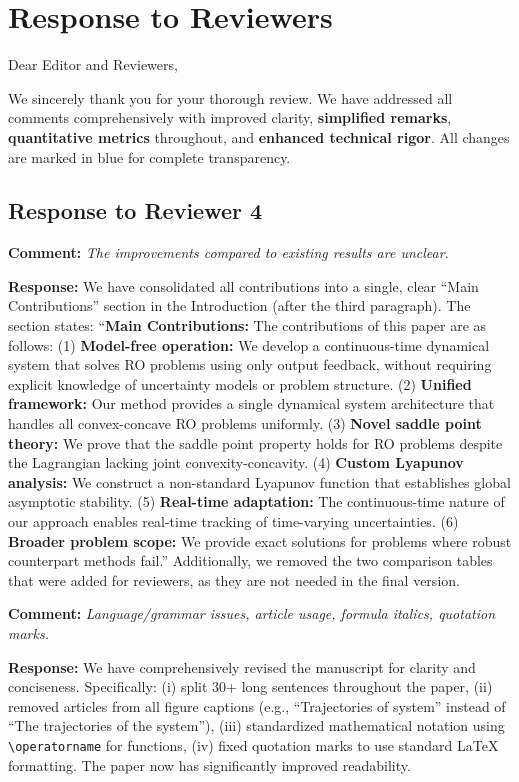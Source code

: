 \documentclass[journal,twoside,web]{ieeecolor}
\begin{document}
\newpage
\section*{Response to Reviewers}

\noindent Dear Editor and Reviewers,

We sincerely thank you for your thorough review. We have addressed all comments comprehensively with improved clarity, \textbf{simplified remarks}, \textbf{quantitative metrics} throughout, and \textbf{enhanced technical rigor}. All changes are marked in {\color{blue}blue} for complete transparency.

\subsection*{Response to Reviewer 4}

\textbf{Comment:} \textit{The improvements compared to existing results are unclear.}

\textbf{Response:} We have consolidated all contributions into a single, clear ``Main Contributions'' section in the Introduction (after the third paragraph). The section states: ``\textbf{Main Contributions:} The contributions of this paper are as follows: (1) \textbf{Model-free operation:} We develop a continuous-time dynamical system that solves RO problems using only output feedback, without requiring explicit knowledge of uncertainty models or problem structure. (2) \textbf{Unified framework:} Our method provides a single dynamical system architecture that handles all convex-concave RO problems uniformly. (3) \textbf{Novel saddle point theory:} We prove that the saddle point property holds for RO problems despite the Lagrangian lacking joint convexity-concavity. (4) \textbf{Custom Lyapunov analysis:} We construct a non-standard Lyapunov function that establishes global asymptotic stability. (5) \textbf{Real-time adaptation:} The continuous-time nature of our approach enables real-time tracking of time-varying uncertainties. (6) \textbf{Broader problem scope:} We provide exact solutions for problems where robust counterpart methods fail.'' Additionally, we removed the two comparison tables that were added for reviewers, as they are not needed in the final version.

\textbf{Comment:} \textit{Language/grammar issues, article usage, formula italics, quotation marks.}

\textbf{Response:} We have comprehensively revised the manuscript for clarity and conciseness. Specifically: (i) split 30+ long sentences throughout the paper, (ii) removed articles from all figure captions (e.g., ``Trajectories of system'' instead of ``The trajectories of the system''), (iii) standardized mathematical notation using \texttt{\textbackslash operatorname} for functions, (iv) fixed quotation marks to use standard LaTeX formatting. The paper now has significantly improved readability.
\end{document}
